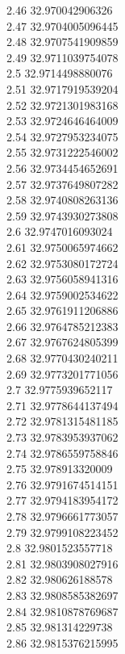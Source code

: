 {2.46	32.970042906326\\
2.47	32.9704005096445\\
2.48	32.9707541909859\\
2.49	32.9711039754078\\
2.5	32.9714498880076\\
2.51	32.9717919539204\\
2.52	32.9721301983168\\
2.53	32.9724646464009\\
2.54	32.9727953234075\\
2.55	32.9731222546002\\
2.56	32.9734454652691\\
2.57	32.9737649807282\\
2.58	32.9740808263136\\
2.59	32.9743930273808\\
2.6	32.9747016093024\\
2.61	32.9750065974662\\
2.62	32.9753080172724\\
2.63	32.9756058941316\\
2.64	32.9759002534622\\
2.65	32.9761911206886\\
2.66	32.9764785212383\\
2.67	32.9767624805399\\
2.68	32.9770430240211\\
2.69	32.9773201771056\\
2.7	32.9775939652117\\
2.71	32.9778644137494\\
2.72	32.9781315481185\\
2.73	32.9783953937062\\
2.74	32.9786559758846\\
2.75	32.978913320009\\
2.76	32.9791674514151\\
2.77	32.9794183954172\\
2.78	32.9796661773057\\
2.79	32.9799108223452\\
2.8	32.9801523557718\\
2.81	32.9803908027916\\
2.82	32.980626188578\\
2.83	32.9808585382697\\
2.84	32.9810878769687\\
2.85	32.981314229738\\
2.86	32.9815376215995\\
}
